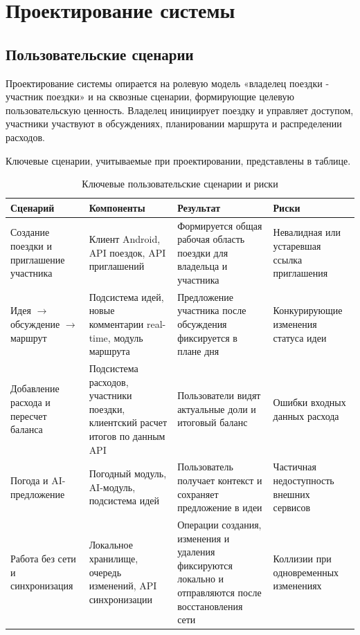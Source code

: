 \section{Проектирование системы}


\subsection{Пользовательские сценарии}
Проектирование системы опирается на ролевую модель «владелец поездки - участник поездки» и на сквозные сценарии, формирующие целевую пользовательскую ценность. Владелец инициирует поездку и управляет доступом, участники участвуют в обсуждениях, планировании маршрута и распределении расходов.

Ключевые сценарии, учитываемые при проектировании, представлены в таблице.

\begin{table}[H]
\centering
\small
\caption{Ключевые пользовательские сценарии и риски}
\begin{tabular}{|p{3.2cm}|p{3.2cm}|p{4cm}|p{3.4cm}|}
\hline
Сценарий & Компоненты & Результат & Риски \\ 
\hline
Создание поездки и приглашение участника & Клиент Android, API поездок, API приглашений & Формируется общая рабочая область поездки для владельца и участника & Невалидная или устаревшая ссылка приглашения \\ 
\hline
Идея $\rightarrow$ обсуждение $\rightarrow$ маршрут & Подсистема идей, новые комментарии real-time, модуль маршрута & Предложение участника после обсуждения фиксируется в плане дня & Конкурирующие изменения статуса идеи \\ 
\hline
Добавление расхода и пересчет баланса & Подсистема расходов, участники поездки, клиентский расчет итогов по данным API & Пользователи видят актуальные доли и итоговый баланс & Ошибки входных данных расхода \\ 
\hline
Погода и AI-предложение & Погодный модуль, AI-модуль, подсистема идей & Пользователь получает контекст и сохраняет предложение в идеи & Частичная недоступность внешних сервисов \\ 
\hline
Работа без сети и синхронизация & Локальное хранилище, очередь изменений, API синхронизации & Операции создания, изменения и удаления фиксируются локально и отправляются после восстановления сети & Коллизии при одновременных изменениях \\ 
\hline
\end{tabular}
\end{table}

